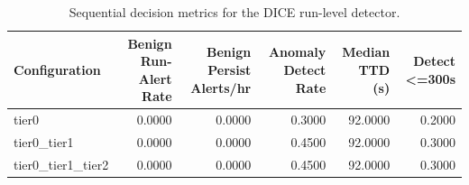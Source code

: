 \begin{table}[t]
\centering
\caption{Sequential decision metrics for the DICE run-level detector.}
\label{tab:dice_sequential_metrics}
\footnotesize
\begin{tabular}{lrrrrr}
\toprule
Configuration & Benign Run-Alert Rate & Benign Persist Alerts/hr & Anomaly Detect Rate & Median TTD (s) & Detect <=300s \\
\midrule
tier0 & 0.0000 & 0.0000 & 0.3000 & 92.0000 & 0.2000 \\
tier0_tier1 & 0.0000 & 0.0000 & 0.4500 & 92.0000 & 0.3000 \\
tier0_tier1_tier2 & 0.0000 & 0.0000 & 0.4500 & 92.0000 & 0.3000 \\
\bottomrule
\end{tabular}

\end{table}
